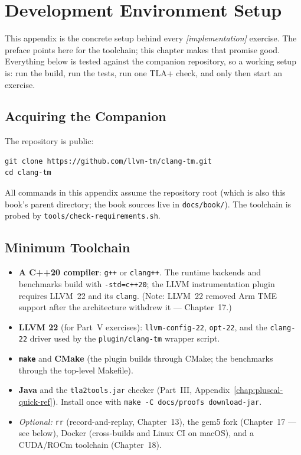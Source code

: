 \chapter{Development Environment Setup}
\label{chap:dev-setup}

This appendix is the concrete setup behind every \emph{[implementation]}
exercise.  The preface points here for the toolchain; this chapter makes
that promise good.  Everything below is tested against the companion
repository, so a working setup is: run the build, run the tests, run one
TLA+ check, and only then start an exercise.

\section{Acquiring the Companion}

The repository is public:

\begin{verbatim}
git clone https://github.com/llvm-tm/clang-tm.git
cd clang-tm
\end{verbatim}

All commands in this appendix assume the repository root (which is also
this book's parent directory; the book sources live in
\texttt{docs/book/}).  The toolchain is probed by
\texttt{tools/check-requirements.sh}.

\section{Minimum Toolchain}

\begin{itemize}
    \item \textbf{A C++20 compiler}: \texttt{g++} or \texttt{clang++}.
          The runtime backends and benchmarks build with
          \texttt{-std=c++20}; the LLVM instrumentation plugin requires
          LLVM~22 and its \texttt{clang}. (Note: LLVM~22 removed Arm TME
          support after the architecture withdrew it --- Chapter~17.)
    \item \textbf{LLVM 22} (for Part~V exercises): \texttt{llvm-config-22},
          \texttt{opt-22}, and the \texttt{clang-22} driver used by the
          \texttt{plugin/clang-tm} wrapper script.
    \item \textbf{\texttt{make}} and \textbf{CMake} (the plugin builds
          through CMake; the benchmarks through the top-level Makefile).
    \item \textbf{Java} and the \texttt{tla2tools.jar} checker (Part~III,
          Appendix~\ref{chap:pluscal-quick-ref}).  Install once with
          \texttt{make -C docs/proofs download-jar}.
    \item \emph{Optional:} \texttt{rr} (record-and-replay, Chapter~13),
          the gem5 fork (Chapter~17 --- see below), Docker (cross-builds
          and Linux CI on macOS), and a CUDA/ROCm toolchain (Chapter~18).
\end{itemize}

